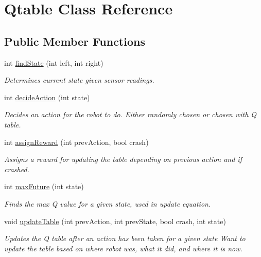 \hypertarget{classQtable}{\section{Qtable Class Reference}
\label{classQtable}
}
\subsection*{Public Member Functions}
\begin{DoxyCompactItemize}
\item 
int \hyperlink{classQtable_a9235e8621fd1fd9bbc702cc2784ac45d}{find\-State} (int left, int right)
\begin{DoxyCompactList}\small\item\em Determines current state given sensor readings. \end{DoxyCompactList}\item 
int \hyperlink{classQtable_ab6cd699fc0e8dde171ff27aef603186b}{decide\-Action} (int state)
\begin{DoxyCompactList}\small\item\em Decides an action for the robot to do. Either randomly chosen or chosen with Q table. \end{DoxyCompactList}\item 
int \hyperlink{classQtable_a3724d3425ba776cb913df0ebb2cabdf4}{assign\-Reward} (int prev\-Action, bool crash)
\begin{DoxyCompactList}\small\item\em Assigns a reward for updating the table depending on previous action and if crashed. \end{DoxyCompactList}\item 
int \hyperlink{classQtable_a22175d7aaa86bbbac0712366a8015278}{max\-Future} (int state)
\begin{DoxyCompactList}\small\item\em Finds the max Q value for a given state, used in update equation. \end{DoxyCompactList}\item 
void \hyperlink{classQtable_af05903e3e55805fa09c6a6f1faccf9e2}{update\-Table} (int prev\-Action, int prev\-State, bool crash, int state)
\begin{DoxyCompactList}\small\item\em Updates the Q table after an action has been taken for a given state Want to update the table based on where robot was, what it did, and where it is now. \end{DoxyCompactList}\item 

\end{DoxyCompactItemize}
